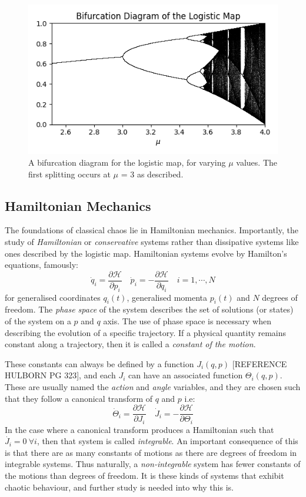 \documentclass[12pt,a4paper]{amsart}
\begin{document}
\begin{figure}[h] 
    \centering
    \includegraphics[scale=0.8]{logistic_map_bifur.png}
    \caption{A bifurcation diagram for the logistic map, for varying $\mu$ values. The first splitting occurs at $\mu$ = 3 as described.}
    \label{fig:bif}
\end{figure}


\subsection{Hamiltonian Mechanics}

The foundations of classical chaos lie in Hamiltonian mechanics. Importantly, the study of \textit{Hamiltonian} or \textit{conservative} systems rather than dissipative systems like ones described by the logistic map. Hamiltonian systems evolve by Hamilton's equations, famously:
$$\dot{q}_{i} = \frac{\partial \mathcal{H}}{\partial p_{i}} \quad \dot{p}_{i} = -\frac{\partial \mathcal{H}}{\partial q_{i}} \quad i = 1, \cdots , N$$
for generalised coordinates $q_{i}(t)$, generalised momenta $p_{i}(t)$ and $N$ degrees of freedom. The \textit{phase space} of the system describes the set of solutions (or states) of the system on a $p$ and $q$ axis. The use of phase space is necessary when describing the evolution of a specific trajectory. If a physical quantity remains constant along a trajectory, then it is called a \textit{constant of the motion}. 

These constants can always be defined by a function $J_{i}(q, p)$ [REFERENCE HULBORN PG 323], and each $J_{i}$ can have an associated function $\Theta_{i}(q, p)$. These are usually named the \textit{action} and \textit{angle} variables, and they are chosen such that they follow a canonical transform of $q$ and $p$ i.e:
$$\dot{\Theta}_{i} = \frac{\partial \mathcal{H}}{\partial J_{i}} \quad \dot{J}_{i} = -\frac{\partial \mathcal{H}}{\partial \Theta_{i}}$$
In the case where a canonical transform produces a Hamiltonian such that $\dot{J_{i}} = 0 \ \forall i$, then that system is called \textit{integrable}. An important consequence of this is that there are as many constants of motions as there are degrees of freedom in integrable systems. Thus naturally, a \textit{non-integrable} system has fewer constants of the motions than degrees of freedom. It is these kinds of systems that exhibit chaotic behaviour, and further study is needed into why this is.
\end{document}
